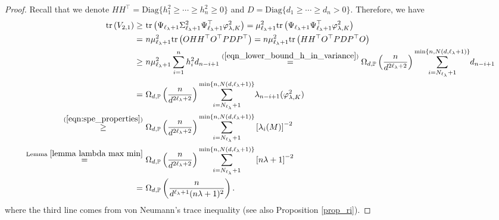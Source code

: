 \documentclass{article}
\theoremstyle{plain}
\theoremstyle{definition}
\theoremstyle{remark}
\newcommand{\green}{\color{green}}
\newcommand{\dhnote}[1]{{\color{red}[#1]} } %
\begin{document}
\begin{appendix}
\begin{proof}
Recall that we denote $HH^{\top}=\text{Diag}\{h_1^2 \geq \cdots \geq h_n^2 \geq 0\}$ and $D=\text{Diag}\{d_1 \geq \cdots \geq d_n > 0\}$. Therefore, we have
\begin{equation*}
    \begin{aligned}
    \mathrm{tr} \left( V_{2, 1} \right) 
        \geq &~
        \mathrm{tr} \left(  \Psi_{\ell_{\lambda}+1} \Sigma_{\ell_{\lambda}+1}^{2} \Psi_{\ell_{\lambda}+1}^{\top} \varphi_{\lambda, K}^2 \right)
        =
        \mu_{\ell_{\lambda}+1}^{2} \mathrm{tr} \left(  \Psi_{\ell_{\lambda}+1}  \Psi_{\ell_{\lambda}+1}^{\top} \varphi_{\lambda, K}^2 \right)\\
        =&~
        n \mu_{\ell_{\lambda}+1}^{2} \mathrm{tr} \left(  OHH^{\top}O^{\top} PDP^{\top} \right) = n \mu_{\ell_{\lambda}+1}^{2}  \mathrm{tr} \left(  HH^{\top}O^{\top} PD P^{\top} O\right)\\
        {\geq} &~
        n \mu_{\ell_{\lambda}+1}^{2}\sum_{i=1}^{n} h_i^2 d_{n-i+1}
        \overset{(\ref{eqn_lower_bound_h_in_variance})}{=}
        \Omega_{d, \mathbb{P}}\left(\frac{n}{d^{2\ell_{\lambda}+2}}\right) 
        {
        \sum_{i=N_{\ell_{\lambda}} + 1}^{\min\{n, N(d, \ell_{\lambda}+1)\}}
        }
        d_{n-i+1}\\
        =&~
        \Omega_{d, \mathbb{P}}\left(\frac{n}{d^{2\ell_{\lambda}+2}}\right) {
        \sum_{i=N_{\ell_{\lambda}} + 1}^{\min\{n, N(d, \ell_{\lambda}+1)\}}
        } \lambda_{n-i+1}(\varphi_{\lambda, K}^2)\\
        \overset{(\ref{eqn:spe_properties})}{\geq}&~
        \Omega_{d, \mathbb{P}}\left(\frac{n}{d^{2\ell_{\lambda}+2}}\right) {
        \sum_{i=N_{\ell_{\lambda}} + 1}^{\min\{n, N(d, \ell_{\lambda}+1)\}}
        } \left[\lambda_i(M)\right]^{-2}\\
        \overset{\text{Lemma } \ref{lemma lambda max min}}{=}&~
        \Omega_{d, \mathbb{P}}\left(\frac{n}{d^{2\ell_{\lambda}+2}}\right) {
        \sum_{i=N_{\ell_{\lambda}} + 1}^{\min\{n, N(d, \ell_{\lambda}+1)\}}
        } \left[n\lambda + 1\right]^{-2}\\
        =&~
        \Omega_{d, \mathbb{P}}\left(\frac{n}{d^{\ell_{\lambda}+1}(n\lambda+1)^2}\right).
    \end{aligned}
\end{equation*}
where the third line comes from von Neumann's trace inequality (see also Proposition \ref{prop_ri}).





\end{proof}
\end{appendix}
\end{document}
